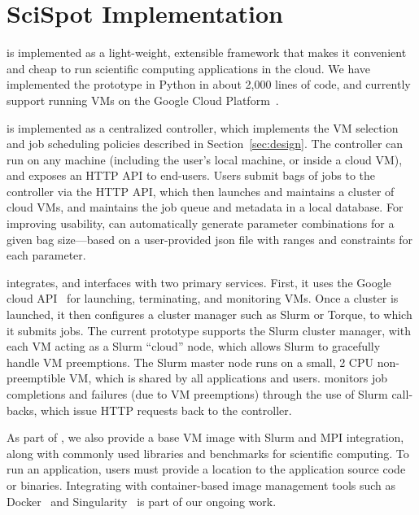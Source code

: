 \vspace*{\subsecspace}
\section{SciSpot Implementation}
\label{sec:impl}

\sysname is implemented as a light-weight, extensible framework that makes it convenient and cheap to run scientific computing applications in the cloud.
We have implemented the \sysname prototype in Python in about 2,000 lines of code, and currently support running VMs on the Google Cloud Platform~\cite{gcp}. 

\sysname is implemented as a centralized controller, which implements the VM selection and job scheduling policies described in Section~\ref{sec:design}. 
The controller can run on any machine (including the user's local machine, or inside a cloud VM), and exposes an HTTP API to end-users. 
Users submit bags of jobs to the controller via the HTTP API, which then launches and maintains a cluster of cloud VMs, and maintains the job queue and metadata in a local database. 
For improving usability, \sysname can automatically generate parameter combinations for a given bag size---based on a user-provided json file with ranges and constraints for each parameter. 


\sysname integrates, and interfaces with two primary services.
First, it uses the Google cloud API~\cite{gcloud-api} for launching, terminating, and monitoring VMs.
Once a cluster is launched, it then configures a cluster manager such as Slurm or Torque, to which it submits jobs. 
The current \sysname prototype supports the Slurm cluster manager, with each VM acting as a Slurm ``cloud'' node, which allows Slurm to gracefully handle VM preemptions.
The Slurm master node runs on a small, 2 CPU non-preemptible VM, which is shared by all applications and users. 
\sysname monitors job completions and failures (due to VM preemptions) through the use of Slurm call-backs, which issue HTTP requests back to the \sysname controller.

As part of \sysname, we also provide a base VM image with Slurm and MPI integration, along with commonly used libraries and benchmarks for scientific computing. To run an application, users must provide a location to the application source code or binaries. Integrating \sysname with container-based image management tools such as Docker~\cite{docker} and Singularity~\cite{kurtzer2017singularity} is part of our ongoing work. 





